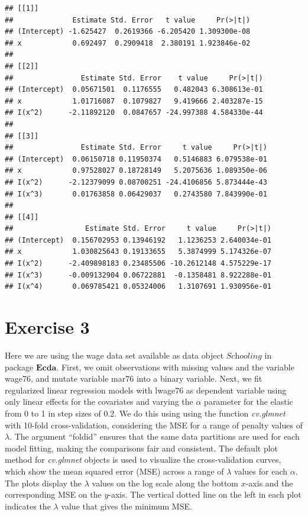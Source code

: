 \documentclass[
]{article}
\begin{document}
\begin{verbatim}
## [[1]]
##              Estimate Std. Error   t value     Pr(>|t|)
## (Intercept) -1.625427  0.2619366 -6.205420 1.309300e-08
## x            0.692497  0.2909418  2.380191 1.923846e-02
## 
## [[2]]
##                Estimate Std. Error    t value     Pr(>|t|)
## (Intercept)  0.05671501  0.1176555   0.482043 6.308613e-01
## x            1.01716087  0.1079827   9.419666 2.403287e-15
## I(x^2)      -2.11892120  0.0847657 -24.997388 4.584330e-44
## 
## [[3]]
##                Estimate Std. Error     t value     Pr(>|t|)
## (Intercept)  0.06150718 0.11950374   0.5146883 6.079538e-01
## x            0.97528027 0.18728149   5.2075636 1.089350e-06
## I(x^2)      -2.12379099 0.08700251 -24.4106856 5.873444e-43
## I(x^3)       0.01763858 0.06429037   0.2743580 7.843990e-01
## 
## [[4]]
##                 Estimate Std. Error     t value     Pr(>|t|)
## (Intercept)  0.156702953 0.13946192   1.1236253 2.640034e-01
## x            1.030825643 0.19133655   5.3874999 5.174326e-07
## I(x^2)      -2.409898183 0.23485506 -10.2612148 4.575229e-17
## I(x^3)      -0.009132904 0.06722881  -0.1358481 8.922288e-01
## I(x^4)       0.069785421 0.05324006   1.3107691 1.930956e-01
\end{verbatim}

\hypertarget{exercise-3}{%
\section{Exercise 3}\label{exercise-3}}

Here we are using the wage data set available as data object
\(\textit{Schooling}\) in package \(\textbf{Ecda}\). First, we omit
observations with missing values and the variable wage76, and mutate
variable mar76 into a binary variable. Next, we fit regularized linear
regression models with lwage76 as dependent variable using only linear
effects for the covariates and varying the \(\alpha\) parameter for the
elastic from 0 to 1 in step sizes of 0.2. We do this using using the
function \textit{cv.glmnet} with 10-fold cross-validation, considering
the MSE for a range of penalty values of \(\lambda\). The argument
``foldid'' ensures that the same data partitions are used for each model
fitting, making the comparisons fair and consistent. The default plot
method for \textit{cv.glmnet} objects is used to visualize the
cross-validation curves, which show the mean squared error (MSE) across
a range of \(\lambda\) values for each \(\alpha\). The plots display the
\(\lambda\) values on the log scale along the bottom \(x\)-axis and the
corresponding MSE on the \(y\)-axis. The vertical dotted line on the
left in each plot indicates the \(\lambda\) value that gives the minimum
MSE.
\end{document}
